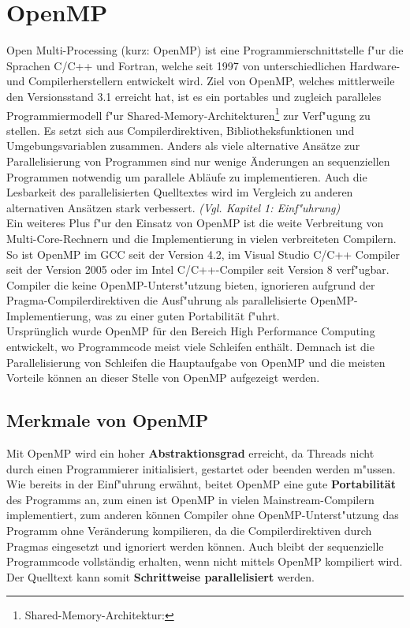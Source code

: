 \documentclass[11pt]{scrartcl}
\begin{document}
\section{OpenMP} Open Multi-Processing (kurz: OpenMP) ist eine Programmierschnittstelle
f"ur die Sprachen C/C++ und Fortran, welche seit 1997 von unterschiedlichen Hardware- und Compilerherstellern entwickelt wird. Ziel von OpenMP, welches mittlerweile den
Versionsstand 3.1 erreicht hat, ist es ein portables und zugleich paralleles
Programmiermodell f"ur Shared-Memory-Architekturen\footnote{Shared-Memory-Architektur: } zur Verf"ugung zu stellen. Es setzt sich aus Compilerdirektiven, Bibliotheksfunktionen und Umgebungsvariablen zusammen. Anders als viele alternative Ansätze zur Parallelisierung von Programmen sind nur wenige Änderungen an sequenziellen Programmen notwendig um parallele Abläufe zu implementieren. Auch die Lesbarkeit des parallelisierten Quelltextes wird im Vergleich zu anderen alternativen Ansätzen stark verbessert. \textit{(Vgl. \cite{omp08} Kapitel 1: Einf"uhrung)} \\ Ein weiteres Plus f"ur den Einsatz von OpenMP ist die weite Verbreitung von Multi-Core-Rechnern und die Implementierung in vielen verbreiteten Compilern. So ist OpenMP im GCC seit der Version 4.2, im Visual Studio C/C++ Compiler seit der Version 2005 oder im Intel C/C++-Compiler seit Version 8 verf"ugbar. Compiler die keine OpenMP-Unterst"utzung bieten, ignorieren aufgrund der Pragma-Compilerdirektiven die Ausf"uhrung als parallelisierte OpenMP-Implementierung, was zu einer guten Portabilität f"uhrt. \\
Ursprünglich wurde OpenMP für den Bereich High Performance Computing entwickelt, wo Programmcode meist viele Schleifen enthält. Demnach ist die Parallelisierung von Schleifen die Hauptaufgabe von OpenMP und die meisten Vorteile können an dieser Stelle von OpenMP aufgezeigt werden. 

\subsection{Merkmale von OpenMP}

Mit OpenMP wird ein hoher \textbf{Abstraktionsgrad} erreicht, da Threads nicht durch einen Programmierer initialisiert, gestartet oder beenden werden m"ussen. Wie bereits in der Einf"uhrung erwähnt, beitet OpenMP eine gute \textbf{Portabilität} des Programms an, zum einen ist OpenMP in vielen Mainstream-Compilern implementiert, zum anderen können Compiler ohne OpenMP-Unterst"utzung das Programm ohne Veränderung kompilieren, da die Compilerdirektiven durch Pragmas eingesetzt und ignoriert werden können. Auch bleibt der sequenzielle Programmcode vollständig erhalten, wenn nicht mittels OpenMP kompiliert wird. Der Quelltext kann somit \textbf{Schrittweise parallelisiert} werden. 
\end{document}
